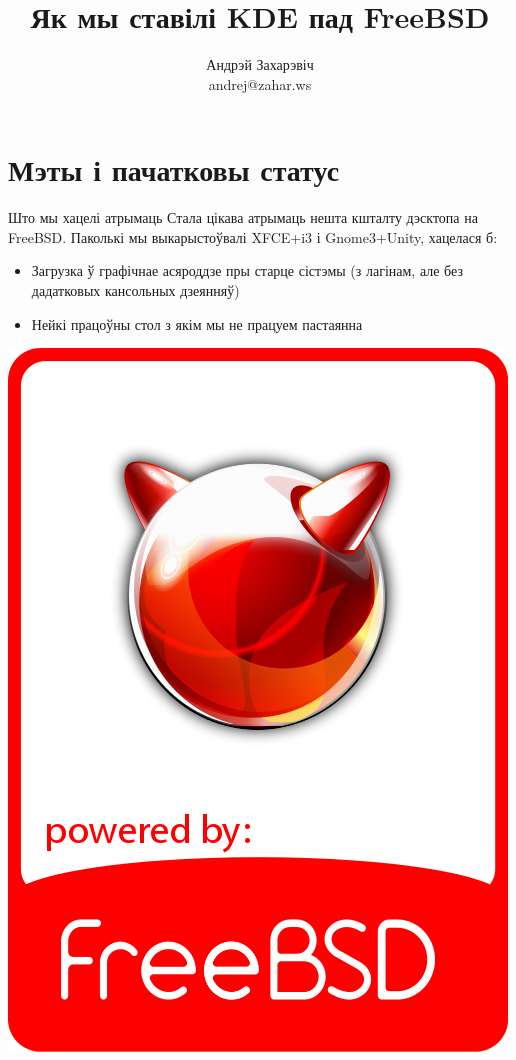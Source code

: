 \documentclass[ignorenonframetext,hyperref={pdftex,unicode}]{beamer}
\title{Як мы ставілі KDE пад FreeBSD} %
\author["Андрэй Захарэвіч"]{Андрэй Захарэвіч\\ andrej@zahar.ws} %
\begin{document}

\frame{\titlepage} %


\section{Мэты і пачатковы статус} %

\begin{frame}{Што мы хацелі атрымаць} %
	Стала цікава атрымаць нешта кшталту дэсктопа на FreeBSD. Паколькі мы выкарыстоўвалі XFCE+i3 і Gnome3+Unity, хацелася б: \pause
	\begin{itemize}
		\item Загрузка ў графічнае асяроддзе пры старце сістэмы (з лагінам, але без дадатковых кансольных дзеянняў) \pause
		\item Нейкі працоўны стол з якім мы не працуем пастаянна
	\end{itemize}
	\begin{center}
 		\includegraphics[height=0.5\textheight,keepaspectratio]{freebsd_badge} %
	\end{center}
\end{frame} %
\end{document}
